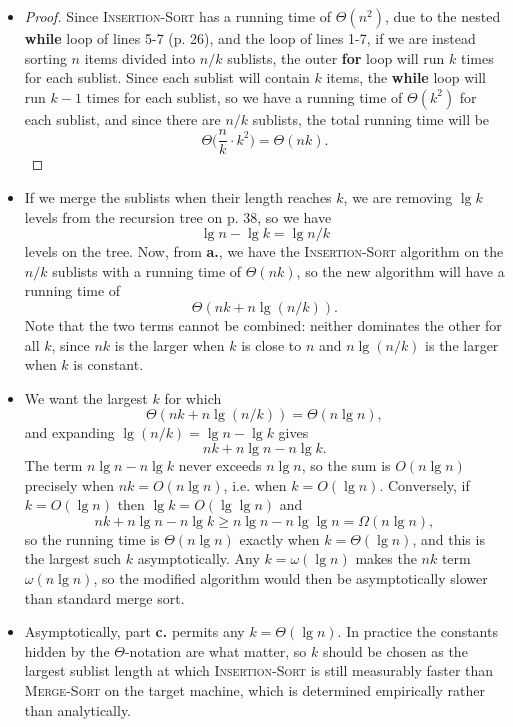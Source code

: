 \begin{itemize}
  \item[\textbf{a.}]
    \begin{proof}
      Since \textsc{Insertion-Sort} has a running time of $\Theta(n^2)$,
      due to the nested \textbf{while} loop of lines 5-7 (p. 26), and the
      loop of lines 1-7, if we are instead sorting $n$ items divided into
      $n/k$ sublists, the outer \textbf{for} loop will run $k$ times for
      each sublist. Since each sublist will contain $k$ items, the
      \textbf{while}
      loop will run $k - 1$ times for each sublist, so we have a running time
      of $\Theta(k^2)$ for each sublist, and since there are $n/k$ sublists,
      the total running time will be
      \[
        \Theta\biggl(\frac{n}{k}\cdot k^2\biggr) = \Theta(nk).
      \]
    \end{proof}
  \item[\textbf{b.}] If we merge the sublists when their length
    reaches $k$, we are
    removing $\lg{k}$ levels from the recursion tree on p. 38, so we have
    \[
      \lg{n} - \lg{k} = \lg{n/k}
    \]
    levels on the tree. Now, from \textbf{a.}, we have the
    \textsc{Insertion-Sort}
    algorithm on the $n/k$ sublists with a running time of $\Theta(nk)$, so the
    new algorithm will have a running time of
    \[
      \Theta(nk + n\lg{(n/k)}).
    \]
    Note that the two terms cannot be combined: neither dominates the other for
    all $k$, since $nk$ is the larger when $k$ is close to $n$ and
    $n\lg{(n/k)}$ is the larger when $k$ is constant.
  \item[\textbf{c.}] We want the largest $k$ for which
    \[
      \Theta(nk + n\lg{(n/k)}) = \Theta(n\lg{n}),
    \]
    and expanding $\lg{(n/k)} = \lg{n} - \lg{k}$ gives
    \[
      nk + n\lg{n} - n\lg{k}.
    \]
    The term $n\lg{n} - n\lg{k}$ never exceeds $n\lg{n}$, so the sum is
    $O(n\lg{n})$ precisely when $nk = O(n\lg{n})$, i.e. when $k = O(\lg{n})$.
    Conversely, if $k = O(\lg{n})$ then $\lg{k} = O(\lg\lg{n})$ and
    \[
      nk + n\lg{n} - n\lg{k} \geq n\lg{n} - n\lg\lg{n} = \Omega(n\lg{n}),
    \]
    so the running time is $\Theta(n\lg{n})$ exactly when $k = \Theta(\lg{n})$,
    and this is the largest such $k$ asymptotically. Any $k = \omega(\lg{n})$
    makes the $nk$ term $\omega(n\lg{n})$, so the modified algorithm would then
    be asymptotically slower than standard merge sort.
  \item[\textbf{d.}] Asymptotically, part \textbf{c.} permits any
    $k = \Theta(\lg{n})$. In practice the constants hidden by the
    $\Theta$-notation are what matter, so $k$ should be chosen as the largest
    sublist length at which \textsc{Insertion-Sort} is still measurably faster
    than \textsc{Merge-Sort} on the target machine, which is determined
    empirically rather than analytically.
\end{itemize}
